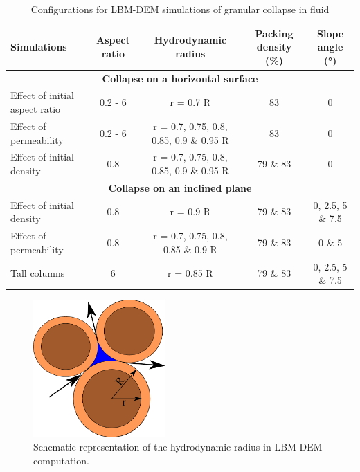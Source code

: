 \begin{landscape}
\centering
\begin{table}
\centering
\caption{Configurations for LBM-DEM simulations of granular collapse in fluid}
\label{table:lbm-dem-setup}
\begin{tabular}{lcccc}
\toprule
\textbf{Simulations} & \textbf{Aspect ratio} & \textbf{Hydrodynamic radius} & 
\textbf{Packing density (\%)} & \textbf{Slope angle (\si{\degree})}\\ \midrule
\multicolumn{5}{c}{\textbf{Collapse on a horizontal surface}} \\
Effect of initial aspect ratio & 0.2 - 6 & r = 0.7 R &  83 & 0 \\
Effect of permeability & 0.2 - 6 & r = 0.7, 0.75, 0.8, 0.85, 0.9 \& 0.95 R &  
83 & 0 \\
Effect of initial density & 0.8 & r = 0.7, 0.75, 0.8, 0.85, 0.9 \& 0.95 R 
& 79 \& 83 & 0 \\ \midrule
\multicolumn{5}{c}{\textbf{Collapse on an inclined plane}} \\
Effect of initial density & 0.8 & r = 0.9 R & 79 \& 83 & 0, 2.5, 5 \& 7.5 
\\
Effect of permeability & 0.8 & r = 0.7, 0.75, 0.8, 0.85 \& 0.9 R &  79 \& 
83 & 0 \& 5 \\ \midrule
Tall columns & 6 & r = 0.85 R & 79 \& 83 & 0, 2.5, 5 \& 7.5 \\
\bottomrule
\end{tabular}
\end{table}
\end{landscape}

\begin{figure}[tbhp]
\centering
\includegraphics[width=0.45\textwidth]{reduction}
\caption{Schematic representation of the hydrodynamic radius in LBM-DEM 
computation.}
\label{fig:reduction}
\end{figure}

